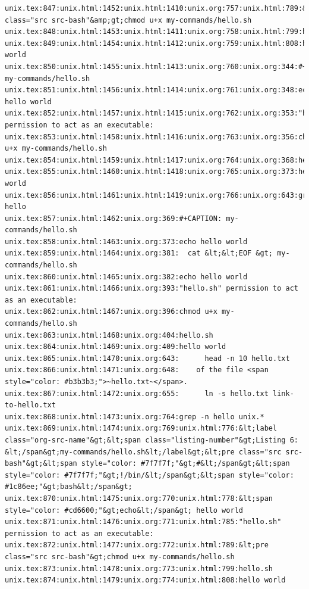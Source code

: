 \documentclass[11pt]{article}
\begin{document}
\begin{verbatim}
unix.tex:847:unix.html:1452:unix.html:1410:unix.org:757:unix.html:789:&amp;lt;pre class="src src-bash"&amp;gt;chmod u+x my-commands/hello.sh
unix.tex:848:unix.html:1453:unix.html:1411:unix.org:758:unix.html:799:hello.sh
unix.tex:849:unix.html:1454:unix.html:1412:unix.org:759:unix.html:808:hello world
unix.tex:850:unix.html:1455:unix.html:1413:unix.org:760:unix.org:344:#+CAPTION: my-commands/hello.sh
unix.tex:851:unix.html:1456:unix.html:1414:unix.org:761:unix.org:348:echo hello world
unix.tex:852:unix.html:1457:unix.html:1415:unix.org:762:unix.org:353:"hello.sh" permission to act as an executable:
unix.tex:853:unix.html:1458:unix.html:1416:unix.org:763:unix.org:356:chmod u+x my-commands/hello.sh
unix.tex:854:unix.html:1459:unix.html:1417:unix.org:764:unix.org:368:hello.sh
unix.tex:855:unix.html:1460:unix.html:1418:unix.org:765:unix.org:373:hello world
unix.tex:856:unix.html:1461:unix.html:1419:unix.org:766:unix.org:643:grep hello 
unix.tex:857:unix.html:1462:unix.org:369:#+CAPTION: my-commands/hello.sh
unix.tex:858:unix.html:1463:unix.org:373:echo hello world
unix.tex:859:unix.html:1464:unix.org:381:  cat &lt;&lt;EOF &gt; my-commands/hello.sh
unix.tex:860:unix.html:1465:unix.org:382:echo hello world
unix.tex:861:unix.html:1466:unix.org:393:"hello.sh" permission to act as an executable:
unix.tex:862:unix.html:1467:unix.org:396:chmod u+x my-commands/hello.sh
unix.tex:863:unix.html:1468:unix.org:404:hello.sh
unix.tex:864:unix.html:1469:unix.org:409:hello world
unix.tex:865:unix.html:1470:unix.org:643:      head -n 10 hello.txt
unix.tex:866:unix.html:1471:unix.org:648:    of the file <span style="color: #b3b3b3;">~hello.txt~</span>.
unix.tex:867:unix.html:1472:unix.org:655:      ln -s hello.txt link-to-hello.txt
unix.tex:868:unix.html:1473:unix.org:764:grep -n hello unix.*
unix.tex:869:unix.html:1474:unix.org:769:unix.html:776:&lt;label class="org-src-name"&gt;&lt;span class="listing-number"&gt;Listing 6: &lt;/span&gt;my-commands/hello.sh&lt;/label&gt;&lt;pre class="src src-bash"&gt;&lt;span style="color: #7f7f7f;"&gt;#&lt;/span&gt;&lt;span style="color: #7f7f7f;"&gt;!/bin/&lt;/span&gt;&lt;span style="color: #1c86ee;"&gt;bash&lt;/span&gt;
unix.tex:870:unix.html:1475:unix.org:770:unix.html:778:&lt;span style="color: #cd6600;"&gt;echo&lt;/span&gt; hello world
unix.tex:871:unix.html:1476:unix.org:771:unix.html:785:"hello.sh" permission to act as an executable:
unix.tex:872:unix.html:1477:unix.org:772:unix.html:789:&lt;pre class="src src-bash"&gt;chmod u+x my-commands/hello.sh
unix.tex:873:unix.html:1478:unix.org:773:unix.html:799:hello.sh
unix.tex:874:unix.html:1479:unix.org:774:unix.html:808:hello world

\end{verbatim}
\end{document}
